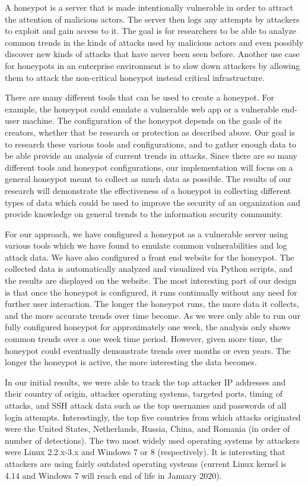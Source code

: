 A honeypot is a server that is made intentionally vulnerable in order to attract the attention of malicious actors. The server then logs any attempts by attackers to exploit and gain access to it. The goal is for researchers to be able to analyze common trends in the kinds of attacks used by malicious actors and even possibly discover new kinds of attacks that have never been seen before. Another use case for honeypots in an enterprise environment is to slow down attackers by allowing them to attack the non-critical honeypot instead critical infrastructure. 

There are many different tools that can be used to create a honeypot. For example, the honeypot could emulate a vulnerable web app or a vulnerable end-user machine. The configuration of the honeypot depends on the goals of its creators, whether that be research or protection as described above. Our goal is to research these various tools and configurations, and to gather enough data to be able provide an analysis of current trends in attacks. Since there are so many different tools and honeypot configurations, our implementation will focus on a general honeypot meant to collect as much data as possible. The results of our research will demonstrate the effectiveness of a honeypot in collecting different types of data which could be used to improve the security of an organization and provide knowledge on general trends to the information security community. 

For our approach, we have configured a honeypot as a vulnerable server using various tools which we have found to emulate common vulnerabilities and log attack data. We have also configured a front end website for the honeypot. The collected data is automatically analyzed and visualized via Python scripts, and the results are displayed on the website. The most interesting part of our design is that once the honeypot is configured, it runs continually without any need for further user interaction. The longer the honeypot runs, the more data it collects, and the more accurate trends over time become. As we were only able to run our fully configured honeypot for approximately one week, the analysis only shows common trends over a one week time period. However, given more time, the honeypot could eventually demonstrate trends over months or even years. The longer the honeypot is active, the more interesting the data becomes. 

In our initial results, we were able to track the top attacker IP addresses and their country of origin, attacker operating systems, targeted ports, timing of attacks, and SSH attack data such as the top usernames and passwords of all login attempts. Interestingly, the top five countries from which attacks originated were the United States, Netherlands, Russia, China, and Romania (in order of number of detections). The two most widely used operating systems by attackers were Linux 2.2.x-3.x and Windows 7 or 8 (respectively). It is interesting that attackers are using fairly outdated operating systems (current Linux kernel is 4.14 and Windows 7 will reach end of life in January 2020). 

